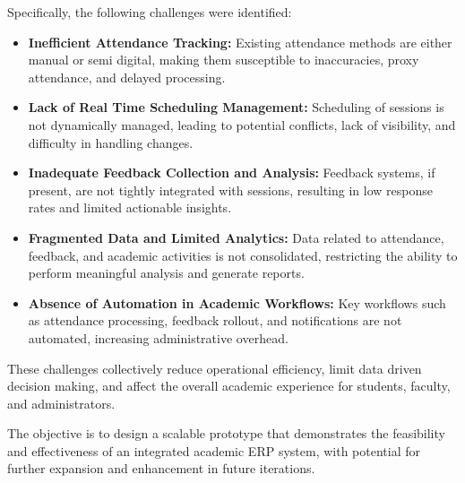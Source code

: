 Specifically, the following challenges were identified:

\begin{itemize}
    \item \textbf{Inefficient Attendance Tracking:}
    Existing attendance methods are either manual or semi digital, making them susceptible to
    inaccuracies, proxy attendance, and delayed processing.

    \item \textbf{Lack of Real Time Scheduling Management:}
    Scheduling of sessions is not dynamically managed, leading to potential conflicts, lack of
    visibility, and difficulty in handling changes.

    \item \textbf{Inadequate Feedback Collection and Analysis:}
    Feedback systems, if present, are not tightly integrated with sessions, resulting in low
    response rates and limited actionable insights.

    \item \textbf{Fragmented Data and Limited Analytics:}
    Data related to attendance, feedback, and academic activities is not consolidated, restricting
    the ability to perform meaningful analysis and generate reports.

    \item \textbf{Absence of Automation in Academic Workflows:}
    Key workflows such as attendance processing, feedback rollout, and notifications are not
    automated, increasing administrative overhead.
\end{itemize}

These challenges collectively reduce operational efficiency, limit data driven decision making, and
affect the overall academic experience for students, faculty, and administrators.

The objective is to design a scalable prototype that demonstrates the feasibility and effectiveness of
an integrated academic ERP system, with potential for further expansion and enhancement in future
iterations.
